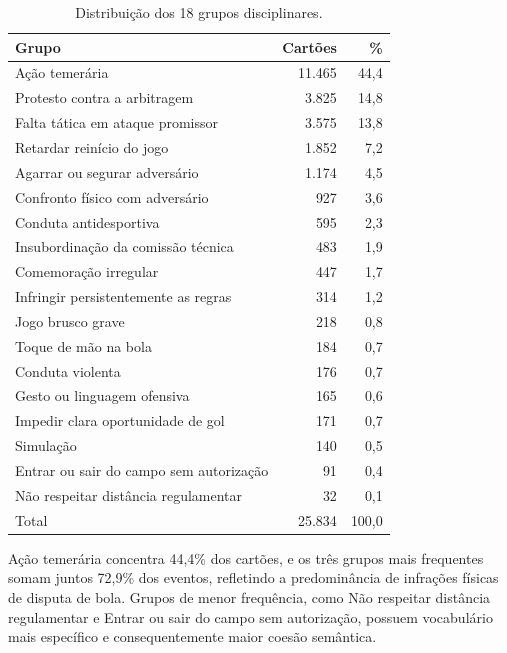 \documentclass[
12pt,
openany,
oneside,
a4paper,
chapter=TITLE,
english,
french,
spanish,
brazil
]{USPSC-classe/USPSC}
\begin{document}
\begin{table}[!htp]
  \centering
  \caption{Distribuição dos 18 grupos disciplinares.}
  \label{tab-grupos}
  \small
  \begin{tabular}{lrr}
    \toprule
    Grupo & Cartões & \% \\
    \midrule
    Ação temerária & 11.465 & 44,4 \\
    Protesto contra a arbitragem & 3.825 & 14,8 \\
    Falta tática em ataque promissor & 3.575 & 13,8 \\
    Retardar reinício do jogo & 1.852 & 7,2 \\
    Agarrar ou segurar adversário & 1.174 & 4,5 \\
    Confronto físico com adversário & 927 & 3,6 \\
    Conduta antidesportiva & 595 & 2,3 \\
    Insubordinação da comissão técnica & 483 & 1,9 \\
    Comemoração irregular & 447 & 1,7 \\
    Infringir persistentemente as regras & 314 & 1,2 \\
    Jogo brusco grave & 218 & 0,8 \\
    Toque de mão na bola & 184 & 0,7 \\
    Conduta violenta & 176 & 0,7 \\
    Gesto ou linguagem ofensiva & 165 & 0,6 \\
    Impedir clara oportunidade de gol & 171 & 0,7 \\
    Simulação & 140 & 0,5 \\
    Entrar ou sair do campo sem autorização & 91 & 0,4 \\
    Não respeitar distância regulamentar & 32 & 0,1 \\
    \midrule
    Total & 25.834 & 100,0 \\
    \bottomrule
  \end{tabular}
\end{table}

\FloatBarrier

Ação temerária concentra 44,4\% dos cartões, e os três grupos mais frequentes somam juntos 72,9\% dos eventos, refletindo a predominância de infrações físicas de disputa de bola. Grupos de menor frequência, como Não respeitar distância regulamentar e Entrar ou sair do campo sem autorização, possuem vocabulário mais específico e consequentemente maior coesão semântica.
\end{document}
